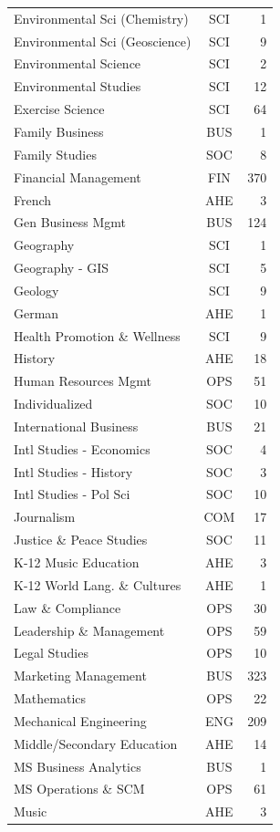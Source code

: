 \documentclass[
  11pt,
  letterpaper,
]{report}
\begin{document}
\begin{longtable}[]{@{}lcr@{}}
Environmental Sci (Chemistry) & SCI & 1 \\
Environmental Sci (Geoscience) & SCI & 9 \\
Environmental Science & SCI & 2 \\
Environmental Studies & SCI & 12 \\
Exercise Science & SCI & 64 \\
Family Business & BUS & 1 \\
Family Studies & SOC & 8 \\
Financial Management & FIN & 370 \\
French & AHE & 3 \\
Gen Business Mgmt & BUS & 124 \\
Geography & SCI & 1 \\
Geography - GIS & SCI & 5 \\
Geology & SCI & 9 \\
German & AHE & 1 \\
Health Promotion \& Wellness & SCI & 9 \\
History & AHE & 18 \\
Human Resources Mgmt & OPS & 51 \\
Individualized & SOC & 10 \\
International Business & BUS & 21 \\
Intl Studies - Economics & SOC & 4 \\
Intl Studies - History & SOC & 3 \\
Intl Studies - Pol Sci & SOC & 10 \\
Journalism & COM & 17 \\
Justice \& Peace Studies & SOC & 11 \\
K-12 Music Education & AHE & 3 \\
K-12 World Lang. \& Cultures & AHE & 1 \\
Law \& Compliance & OPS & 30 \\
Leadership \& Management & OPS & 59 \\
Legal Studies & OPS & 10 \\
Marketing Management & BUS & 323 \\
Mathematics & OPS & 22 \\
Mechanical Engineering & ENG & 209 \\
Middle/Secondary Education & AHE & 14 \\
MS Business Analytics & BUS & 1 \\
MS Operations \& SCM & OPS & 61 \\
Music & AHE & 3 \\

\end{longtable}
\end{document}
